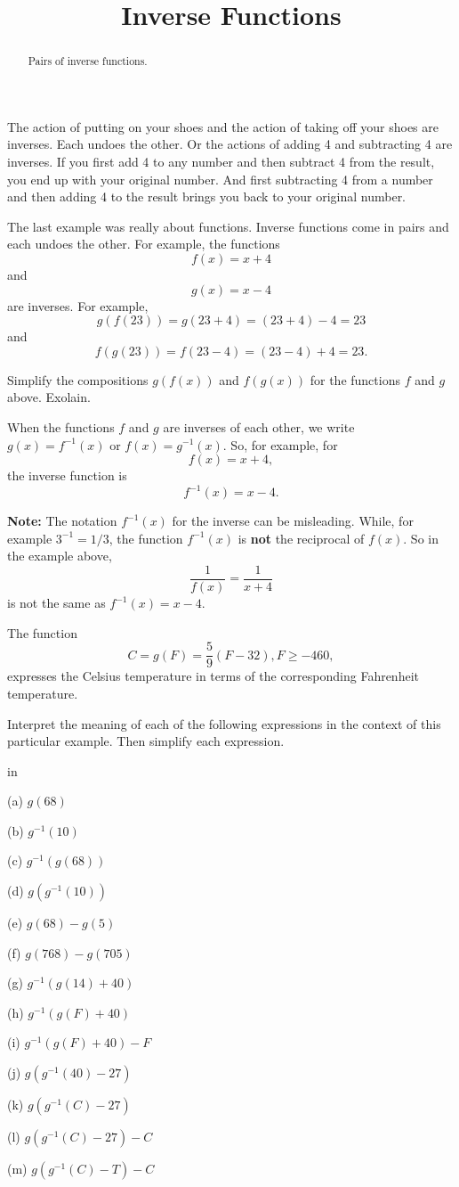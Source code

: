\documentclass{ximera}
\title{Inverse Functions}
\newcommand{\pskip}{\vskip 0.1 in}
\begin{document}
\begin{abstract}
Pairs of inverse functions.
\end{abstract}
\maketitle

The action of putting on your shoes and the action of taking off your shoes are inverses. Each undoes the other. Or the actions of adding 4 and subtracting 4 are inverses. If you first add 4 to any number and then subtract 4 from the result, you end up with your original number. And first subtracting 4 from a number and then adding 4 to the result brings you back to your original number. 

The last example was really about functions. Inverse functions come in pairs and each undoes the other. For example, the functions 
\[
    f(x) = x + 4
\]
and 
\[
  g(x) = x-4
\]
are inverses. For example,
\[
    g(f(23)) = g(23+4) =  (23+4) -4 = 23
\]
and
\[
    f(g(23)) = f(23-4) = (23-4) + 4 = 23 .
\]

\begin{question}   \label{Q1:Inverses}
Simplify the compositions $g(f(x))$ and $f(g(x))$ for the functions $f$ and $g$ above. Exolain.
\end{question}

When the functions $f$ and $g$ are inverses of each other, we write $g(x) = f^{-1}(x)$ or $f(x) = g^{-1}(x)$. So, for example, for 
\[
   f(x) = x+4 ,
\]
the inverse function is
\[
   f^{-1}(x) = x-4.
\]

{\bf Note:} The notation $f^{-1}(x)$ for the inverse can be misleading. While, for example $3^{-1} = 1/3$, the function $f^{-1}(x)$ is {\bf not} the reciprocal of $f(x)$. So in the example above,
\[
     \frac{1}{f(x)} = \frac{1}{x+4} 
\] 
is not the same as $f^{-1}(x) = x-4$.


\begin{example} \label{Ex1:Inverses}
The function
\[
    C = g(F) = \frac{5}{9}\left( F - 32  \right) , F\geq -460 ,
\]
expresses the Celsius temperature in terms of the corresponding Fahrenheit temperature.

Interpret the meaning of each of the following expressions in the context of this particular example. Then simplify each expression.

\pskip

(a) $g(68)$

(b) $g^{-1}(10)$

(c)  $g^{-1}(g(68))$

(d) $g(g^{-1}(10))$

(e) $g(68) - g(5)$

(f) $g(768) - g(705)$

(g) $g^{-1}(g(14)+40)$

(h) $g^{-1}(g(F)+40)$

(i) $g^{-1}(g(F)+40) - F$

(j) $g(g^{-1}(40) - 27)$

(k) $g(g^{-1}(C) - 27)$

(l) $g(g^{-1}(C) - 27) - C$

(m) $g(g^{-1}(C) - T) - C$



\end{example}
\end{document}
